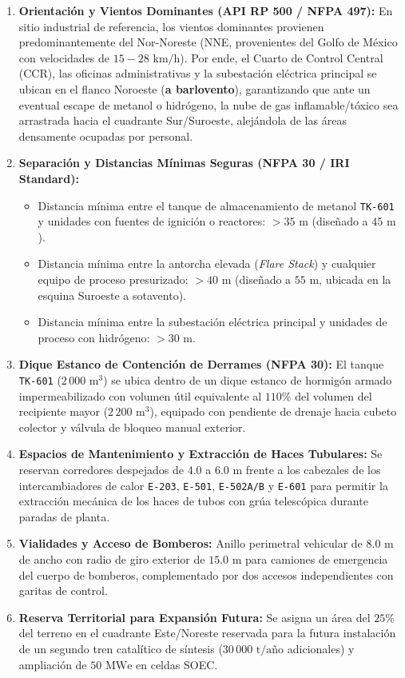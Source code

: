 \documentclass[10pt,letterpaper]{article}
\begin{document}
\begin{enumerate}
    \item \textbf{Orientación y Vientos Dominantes (API RP 500 / NFPA 497):} En sitio industrial de referencia, los vientos dominantes provienen predominantemente del Nor-Noreste (NNE, provenientes del Golfo de México con velocidades de $15-28\text{ km/h}$). Por ende, el Cuarto de Control Central (CCR), las oficinas administrativas y la subestación eléctrica principal se ubican en el flanco Noroeste (\textbf{a barlovento}), garantizando que ante un eventual escape de metanol o hidrógeno, la nube de gas inflamable/tóxico sea arrastrada hacia el cuadrante Sur/Suroeste, alejándola de las áreas densamente ocupadas por personal.
    \item \textbf{Separación y Distancias Mínimas Seguras (NFPA 30 / IRI Standard):}
    \begin{itemize}
        \item Distancia mínima entre el tanque de almacenamiento de metanol \texttt{TK-601} y unidades con fuentes de ignición o reactores: $>35\text{ m}$ (diseñado a $45\text{ m}$).
        \item Distancia mínima entre la antorcha elevada (\textit{Flare Stack}) y cualquier equipo de proceso presurizado: $>40\text{ m}$ (diseñado a $55\text{ m}$, ubicada en la esquina Suroeste a sotavento).
        \item Distancia mínima entre la subestación eléctrica principal y unidades de proceso con hidrógeno: $>30\text{ m}$.
    \end{itemize}
    \item \textbf{Dique Estanco de Contención de Derrames (NFPA 30):} El tanque \texttt{TK-601} ($2\,000\text{ m}^3$) se ubica dentro de un dique estanco de hormigón armado impermeabilizado con volumen útil equivalente al $110\%$ del volumen del recipiente mayor ($2\,200\text{ m}^3$), equipado con pendiente de drenaje hacia cubeto colector y válvula de bloqueo manual exterior.
    \item \textbf{Espacios de Mantenimiento y Extracción de Haces Tubulares:} Se reservan corredores despejados de $4.0$ a $6.0\text{ m}$ frente a los cabezales de los intercambiadores de calor \texttt{E-203}, \texttt{E-501}, \texttt{E-502A/B} y \texttt{E-601} para permitir la extracción mecánica de los haces de tubos con grúa telescópica durante paradas de planta.
    \item \textbf{Vialidades y Acceso de Bomberos:} Anillo perimetral vehicular de $8.0\text{ m}$ de ancho con radio de giro exterior de $15.0\text{ m}$ para camiones de emergencia del cuerpo de bomberos, complementado por dos accesos independientes con garitas de control.
    \item \textbf{Reserva Territorial para Expansión Futura:} Se asigna un área del $25\%$ del terreno en el cuadrante Este/Noreste reservada para la futura instalación de un segundo tren catalítico de síntesis ($30\,000\text{ t/año}$ adicionales) y ampliación de $50\text{ MWe}$ en celdas SOEC.
\end{enumerate}
\end{document}
